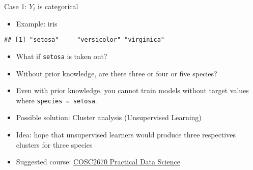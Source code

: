 \documentclass[ignorenonframetext,]{beamer}
\newenvironment{Shaded}{\begin{snugshade}}{\end{snugshade}}
\newcommand{\KeywordTok}[1]{\textcolor[rgb]{0.13,0.29,0.53}{\textbf{#1}}}
\newcommand{\StringTok}[1]{\textcolor[rgb]{0.31,0.60,0.02}{#1}}
\newcommand{\OperatorTok}[1]{\textcolor[rgb]{0.81,0.36,0.00}{\textbf{#1}}}
\newcommand{\NormalTok}[1]{#1}
\providecommand{\tightlist}{%
  \setlength{\itemsep}{0pt}\setlength{\parskip}{0pt}}
\begin{document}
\begin{frame}[fragile]{Case 1: \(Y_{i}\) is categorical}

\begin{itemize}
\tightlist
\item
  Example: iris
\end{itemize}

\begin{Shaded}
\end{Shaded}

\begin{verbatim}
## [1] "setosa"     "versicolor" "virginica"
\end{verbatim}

\begin{itemize}
\tightlist
\item
  What if \texttt{setosa} is taken out?
\item
  Without prior knowledge, are there three or four or five species?
\item
  Even with prior knowledge, you cannot train models without target
  values where \texttt{species\ =\ setosa}.
\item
  Possible solution: Cluster analysis (Unsupervised Learning)
\item
  Idea: hope that unsupervised learners would produce three respectives
  clusters for three species
\item
  Suggested course:
  \href{http://www1.rmit.edu.au/courses/051637}{COSC2670 Practical Data
  Science}
\end{itemize}

\end{frame}
\end{document}
